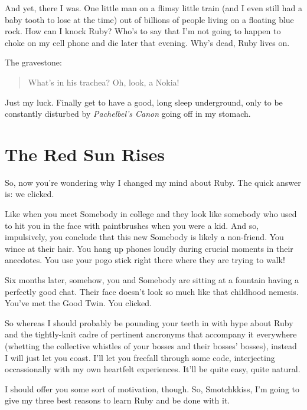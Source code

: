 \documentclass[12pt,twoside]{report}
\begin{document}
And yet, there I was.  One little man on a flimsy little train (and I
even still had a baby tooth to lose at the time) out of billions of
people living on a floating blue rock.  How can I knock Ruby?  Who's
to say that I'm not going to happen to choke on my cell phone and die
later that evening.  Why's dead, Ruby lives on.

The gravestone:

\begin{quote}
What's in his trachea? Oh, look, a Nokia!\end{quote}

Just my luck.  Finally get to have a good, long sleep underground,
only to be constantly disturbed by {\em Pachelbel's Canon} going off
in my stomach.


\section{The Red Sun Rises}


So, now you're wondering why I changed my mind about Ruby.  The quick
answer is: we clicked.

Like when you meet Somebody in college and they look like somebody who
used to hit you in the face with paintbrushes when you were a kid.
And so, impulsively, you conclude that this new Somebody is likely a
non-friend.  You wince at their hair.  You hang up phones loudly
during crucial moments in their anecdotes.  You use your pogo stick
right there where they are trying to walk!

Six months later, somehow, you and Somebody are sitting at a fountain
having a perfectly good chat.  Their face doesn't look so much like
that childhood nemesis.  You've met the Good Twin.  You clicked.

So whereas I should probably be pounding your teeth in with hype about
Ruby and the tightly-knit cadre of pertinent ancronyms that accompany
it everywhere (whetting the collective whistles of your bosses and
their bosses' bosses), instead I will just let you coast.  I'll let
you freefall through some code, interjecting occassionally with my own
heartfelt experiences.  It'll be quite easy, quite natural.

I should offer you some sort of motivation, though.  So, Smotchkkiss,
I'm going to give my three best reasons to learn Ruby and be done with
it.
\end{document}
